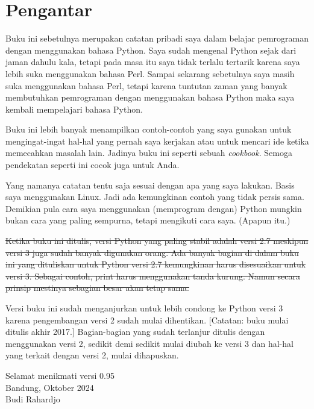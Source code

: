 \chapter*{Pengantar}
Buku ini sebetulnya merupakan catatan pribadi saya dalam belajar pemrograman
dengan menggunakan bahasa Python. Saya sudah mengenal Python sejak dari jaman
dahulu kala, tetapi pada masa itu saya tidak terlalu tertarik karena saya lebih
suka menggunakan bahasa Perl. Sampai sekarang sebetulnya saya masih suka
menggunakan bahasa Perl, tetapi karena tuntutan zaman yang banyak membutuhkan
pemrograman dengan menggunakan bahasa Python maka saya kembali mempelajari
bahasa Python.

Buku ini lebih banyak menampilkan contoh-contoh yang saya gunakan untuk
mengingat-ingat hal-hal yang pernah saya kerjakan atau untuk mencari ide ketika
memecahkan masalah lain. Jadinya buku ini seperti sebuah {\em cookbook}. Semoga
pendekatan seperti ini cocok juga untuk Anda.

Yang namanya catatan tentu saja sesuai dengan apa yang saya lakukan. Basis saya
menggunakan Linux. Jadi ada kemungkinan contoh yang tidak persis sama. Demikian
pula cara saya menggunakan (memprogram dengan) Python mungkin bukan cara yang
paling sempurna, tetapi mengikuti cara saya. (Apapun itu.)

\st{Ketika buku ini ditulis, versi Python yang paling stabil adalah versi 2.7
meskipun versi 3 juga sudah banyak digunakan orang. Ada banyak bagian di dalam
buku ini yang dituliskan untuk Python versi 2.7 kemungkinan harus disesuaikan
untuk versi 3. Sebagai contoh, print harus menggunakan tanda kurung.
Namun secara prinsip mestinya sebagian besar akan tetap sama.} 

Versi buku ini sudah menganjurkan untuk lebih condong ke Python versi 3
karena pengembangan versi 2 sudah mulai dihentikan.
[Catatan: buku mulai ditulis akhir 2017.]
Bagian-bagian yang sudah terlanjur ditulis dengan menggunakan versi 2,
sedikit demi sedikit mulai diubah ke versi 3 dan hal-hal yang terkait
dengan versi 2, mulai dihapuskan.


Selamat menikmati versi 0.95\\
Bandung, Oktober 2024 \\
Budi Rahardjo
